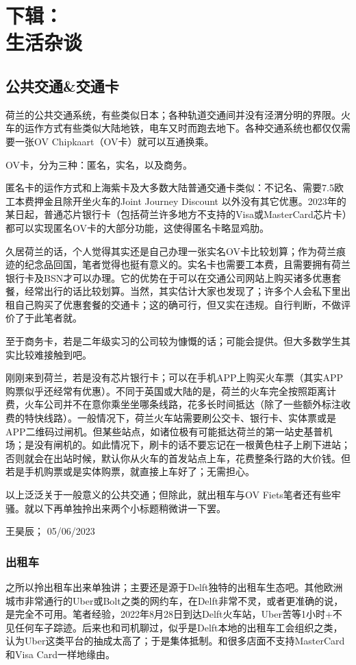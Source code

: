 \chapter[下辑：生活杂谈]{下辑：\\生活杂谈}

\section{公共交通\&交通卡}
荷兰的公共交通系统，有些类似日本；各种轨道交通间并没有泾渭分明的界限。火车的运作方式有些类似大陆地铁，电车又时而跑去地下。各种交通系统也都仅仅需要一张OV Chipkaart（OV卡）就可以互通换乘。

OV卡，分为三种：匿名，实名，以及商务。

匿名卡的运作方式和上海紫卡及大多数大陆普通交通卡类似：不记名、需要7.5欧工本费押金且除开坐火车的Joint Journey Discount 以外没有其它优惠。2023年的某日起，普通芯片银行卡（包括荷兰许多地方不支持的Visa或MasterCard芯片卡）都可以实现匿名OV卡的大部分功能，这使得匿名卡略显鸡肋。

久居荷兰的话，个人觉得其实还是自己办理一张实名OV卡比较划算；作为荷兰痕迹的纪念品回国，笔者觉得也挺有意义的。实名卡也需要工本费，且需要拥有荷兰银行卡及BSN才可以办理。它的优势在于可以在交通公司网站上购买诸多优惠套餐，经常出行的话比较划算。当然，其实估计大家也发现了；许多个人会私下里出租自己购买了优惠套餐的交通卡；这的确可行，但又实在违规。自行判断，不做评价了于此笔者就。

至于商务卡，若是二年级实习的公司较为慷慨的话；可能会提供。但大多数学生其实比较难接触到吧。

刚刚来到荷兰，若是没有芯片银行卡；可以在手机APP上购买火车票（其实APP购票似乎还经常有优惠）。不同于英国或大陆的是，荷兰的火车完全按照距离计费，火车公司并不在意你乘坐坐哪条线路，花多长时间抵达（除了一些额外标注收费的特快线路）。一般情况下，荷兰火车站需要刷公交卡、银行卡、实体票或是APP二维码过闸机。但某些站点，如诸位极有可能抵达荷兰的第一站史基普机场；是没有闸机的。如此情况下，刷卡的话不要忘记在一根黄色柱子上刷下进站；否则就会在出站时候，默认你从火车的首发站点上车，花费整条行路的大价钱。但若是手机购票或是实体购票，就直接上车好了；无需担心。

以上泛泛关于一般意义的公共交通；但除此，就出租车与OV Fiets笔者还有些牢骚。就以下再单独拎出来两个小标题稍微讲一下罢。
\begin{flushright}
王昊辰； 05/06/2023
\end{flushright}

\subsection{出租车}
之所以拎出租车出来单独讲；主要还是源于Delft独特的出租车生态吧。其他欧洲城市非常通行的Uber或Bolt之类的网约车，在Delft非常不灵，或者更准确的说，是完全不可用。笔者经验，2022年8月28日到达Delft火车站，Uber苦等1小时+不见任何车子踪迹。后来也和司机聊过，似乎是Delft本地的出租车工会组织之类，认为Uber这类平台的抽成太高了；于是集体抵制。和很多店面不支持MasterCard和Visa Card一样地缘由。

